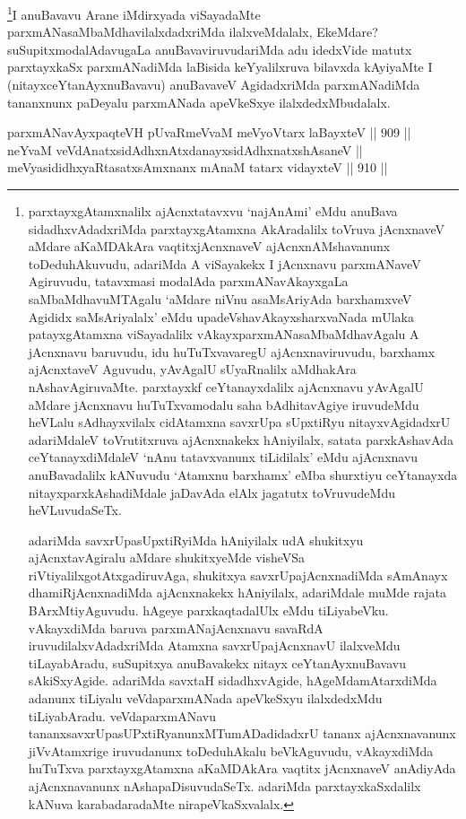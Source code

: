\begin{artha}
\footnote{parxtayxgAtamxnalilx ajAcnxtatavxvu `najAnAmi' eMdu anuBava sidadhxvAdadxriMda parxtayxgAtamxna AkAradalilx toVruva jAcnxnaveV aMdare aKaMDAkAra vaqtitxjAcnxnaveV ajAcnxnAMshavanunx toDeduhAkuvudu, adariMda A viSayakekx I jAcnxnavu parxmANaveV Agiruvudu, tatavxmasi modalAda parxmANavAkayxgaLa saMbaMdhavuMTAgalu `aMdare niVnu asaMsAriyAda barxhamxveV Agididx saMsAriyalalx' eMdu upadeVshavAkayxsharxvaNada mUlaka patayxgAtamxna viSayadalilx vAkayxparxmANasaMbaMdhavAgalu A jAcnxnavu baruvudu, idu huTuTxvavaregU ajAcnxnaviruvudu, barxhamx ajAcnxtaveV Aguvudu, yAvAgalU sUyaRnalilx aMdhakAra nAshavAgiruvaMte. parxtayxkf ceYtanayxdalilx ajAcnxnavu yAvAgalU aMdare jAcnxnavu huTuTxvamodalu saha bAdhitavAgiye iruvudeMdu heVLalu sAdhayxvilalx cidAtamxna savxrUpa sUpxtiRyu nitayxvAgidadxrU adariMdaleV toVrutitxruva ajAcnxnakekx hAniyilalx, satata parxkAshavAda ceYtanayxdiMdaleV `nAnu tatavxvanunx tiLidilalx' eMdu ajAcnxnavu anuBavadalilx kANuvudu `Atamxnu barxhamx' eMba shurxtiyu ceYtanayxda nitayxparxkAshadiMdale jaDavAda elAlx jagatutx toVruvudeMdu heVLuvudaSeTx.

adariMda savxrUpasUpxtiRyiMda hAniyilalx udA shukitxyu ajAcnxtavAgiralu aMdare shukitxyeMde visheVSa riVtiyalilxgotAtxgadiruvAga, shukitxya savxrUpajAcnxnadiMda sAmAnayx dhamiRjAcnxnadiMda ajAcnxnakekx hAniyilalx, adariMdale muMde rajata BArxMtiyAguvudu. hAgeye parxkaqtadalUlx eMdu tiLiyabeVku. vAkayxdiMda baruva parxmANajAcnxnavu savaRdA iruvudilalxvAdadxriMda Atamxna savxrUpajAcnxnavU ilalxveMdu tiLayabAradu, suSupitxya anuBavakekx nitayx ceYtanAyxnuBavavu sAkiSxyAgide. adariMda savxtaH sidadhxvAgide, hAgeMdamAtarxdiMda adanunx tiLiyalu veVdaparxmANada apeVkeSxyu ilalxdedxMdu tiLiyabAradu. veVdaparxmANavu tananxsavxrUpasUPxtiRyanunxMTumADadidadxrU tananx ajAcnxnavanunx jiVvAtamxrige iruvudanunx toDeduhAkalu beVkAguvudu, vAkayxdiMda huTuTxva parxtayxgAtamxna aKaMDAkAra vaqtitx jAcnxnaveV anAdiyAda ajAcnxnavanunx nAshapaDisuvudaSeTx. adariMda parxtayxkaSxdalilx kANuva karabadaradaMte nirapeVkaSxvalalx.}I anuBavavu Arane iMdirxyada viSayadaMte parxmANasaMbaMdhavilalxdadxriMda ilalxveMdalalx, EkeMdare? suSupitxmodalAdavugaLa anuBavaviruvudariMda adu idedxVide matutx parxtayxkaSx parxmANadiMda laBisida keYyalilxruva bilavxda kAyiyaMte I (nitayxceYtanAyxnuBavavu) anuBavaveV AgidadxriMda parxmANadiMda tananxnunx paDeyalu parxmANada apeVkeSxye ilalxdedxMbudalalx.
\end{artha}

\begin{shl}
parxmANavAyxpaqteVH pUvaRmeVvaM meVyoV\s tarx laBayxteV \hfill || 909 ||  \\
neYvaM veVdAnatxsidAdhxnAtxdanayxsidAdhxnatxshAsaneV || \\
meVyasididhxyaRtasatxsAmxnanx mAnaM tatarx vidayxteV \hfill || 910 ||  
\end{shl}

